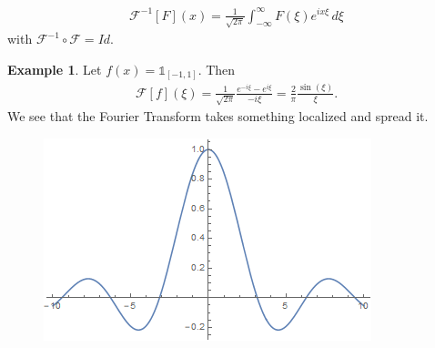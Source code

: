 \documentclass{book}
\theoremstyle{definition}
\newtheorem{exmp}{Example}[section]
\newcommand{\F}{\mathcal{F}}
\begin{document}
\begin{align*}
\F^{-1}[F](x) = \frac{1}{\sqrt{2\pi}}\int^\infty_{-\infty}F(\xi)e^{ix\xi}\,d\xi
\end{align*}
with $\F^{-1}\circ \F = Id$.\\

\begin{exmp}
	Let $f(x) = \mathbb{1}_{[-1,1]}$. Then
	\begin{align*}
	\F[f](\xi) = \frac{1}{\sqrt{2\pi}}\frac{e^{-i\xi} - e^{i\xi}}{-i\xi} = \frac{2}{\pi}\frac{\sin(\xi)}{\xi}.
	\end{align*}
	We see that the Fourier Transform takes something localized and spread it.
	\begin{figure}[h!]
		\centering
		\includegraphics[scale=1]{fourier_1.png}
	\end{figure}
\end{exmp}

$\,$\\
\end{document}
